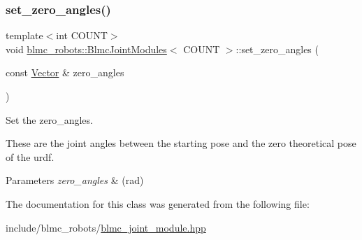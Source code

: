\subsubsection{\texorpdfstring{set\+\_\+zero\+\_\+angles()}{set\_zero\_angles()}}
{\footnotesize\ttfamily template$<$int C\+O\+U\+NT$>$ \\
void \hyperlink{classblmc__robots_1_1BlmcJointModules}{blmc\+\_\+robots\+::\+Blmc\+Joint\+Modules}$<$ C\+O\+U\+NT $>$\+::set\+\_\+zero\+\_\+angles (\begin{DoxyParamCaption}\item[{const \hyperlink{classblmc__robots_1_1BlmcJointModules_abaff382c6fd4b494ec0c17498d94919e}{Vector} \&}]{zero\+\_\+angles }\end{DoxyParamCaption})\hspace{0.3cm}{\ttfamily [inline]}}



Set the zero\+\_\+angles. 

These are the joint angles between the starting pose and the zero theoretical pose of the urdf.


\begin{DoxyParams}{Parameters}
{\em zero\+\_\+angles} & (rad) \\
\hline
\end{DoxyParams}


The documentation for this class was generated from the following file\+:\begin{DoxyCompactItemize}
\item 
include/blmc\+\_\+robots/\hyperlink{blmc__joint__module_8hpp}{blmc\+\_\+joint\+\_\+module.\+hpp}\end{DoxyCompactItemize}
